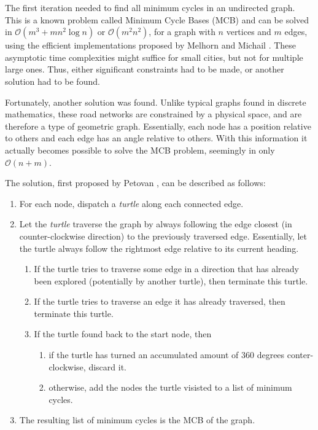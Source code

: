 The first iteration needed to find all minimum cycles in an undirected graph.
This is a known problem called Minimum Cycle Bases (MCB) and can be solved in $\mathcal{O}(m^3 + mn^2 \log n)$ or $\mathcal{O}(m^2n^2)$, for a graph with $n$ vertices and $m$ edges, using the efficient implementations proposed by Melhorn and Michail \cite{mcb_paper}.
These asymptotic time complexities might suffice for small cities, but not for multiple large ones.
Thus, either significant constraints had to be made, or another solution had to be found.

Fortunately, another solution was found.
Unlike typical graphs found in discrete mathematics, these road networks are constrained by a physical space, and are therefore a type of geometric graph.
Essentially, each node has a position relative to others and each edge has an angle relative to others.
With this information it actually becomes possible to solve the MCB problem, seemingly in only $\mathcal{O}(n + m)$.

The solution, first proposed by Petovan \cite{petovan}, can be described as follows:
\vspace{-0.5cm} %
\begin{enumerate}
  \item For each node, dispatch a \textit{turtle} along each connected edge.
  \item Let the \textit{turtle} traverse the graph by always following the edge closest (in counter-clockwise direction) to the previously traversed edge. Essentially, let the turtle always follow the rightmost edge relative to its current heading.
  \begin{enumerate}
    \item If the turtle tries to traverse some edge in a direction that has already been explored (potentially by another turtle), then terminate this turtle.
    \item If the turtle tries to traverse an edge it has already traversed, then terminate this turtle.
    \item If the turtle found back to the start node, then
      \begin{enumerate}
        \item if the turtle has turned an accumulated amount of 360 degrees conter-clockwise, discard it.
        \item otherwise, add the nodes the turtle visisted to a list of minimum cycles.
      \end{enumerate}
  \end{enumerate}
  \item The resulting list of minimum cycles is the MCB of the graph.
\end{enumerate}

